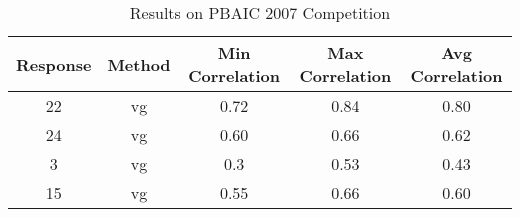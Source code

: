 \documentclass{article}
\begin{document}
\begin{table}
\caption{Results on PBAIC 2007 Competition}
\begin{tabular}{|c|c|c|c|c|}

	     \hline
	     \textbf{Response} &  \textbf{Method} & \textbf{Min Correlation} & \textbf{Max Correlation} & \textbf{Avg Correlation} \\
	     \hline
        \hline
		  22 & vg & 0.72 & 0.84 & 0.80 \\
           
          \hline
		  24 & vg & 0.60 & 0.66 & 0.62 \\
           
          \hline
		  3 & vg & 0.3 & 0.53 & 0.43 \\
           
         	 \hline
		  15 & vg & 0.55& 0.66 & 0.60 \\
           
\hline

\end{tabular}
\label{table:t2}
\end{table}
\end{document}
